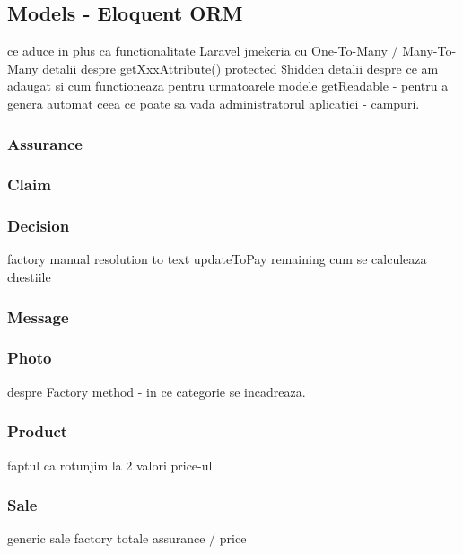 \subsection{Models - Eloquent ORM}
	ce aduce in plus ca functionalitate Laravel
	jmekeria cu One-To-Many / Many-To-Many
	detalii despre getXxxAttribute()
	protected \$hidden
	detalii despre ce am adaugat si cum functioneaza pentru urmatoarele modele
	getReadable - pentru a genera automat ceea ce poate sa vada administratorul aplicatiei - campuri.
	\subsubsection{Assurance}
	\subsubsection{Claim}
	\subsubsection{Decision}
		factory manual
		resolution to text
		updateToPay
		remaining
		cum se calculeaza chestiile
	\subsubsection{Message}
	\subsubsection{Photo}
		despre Factory method - in ce categorie se incadreaza.
	\subsubsection{Product}
		faptul ca rotunjim la 2 valori price-ul
	\subsubsection{Sale}
		generic sale factory
		totale assurance / price